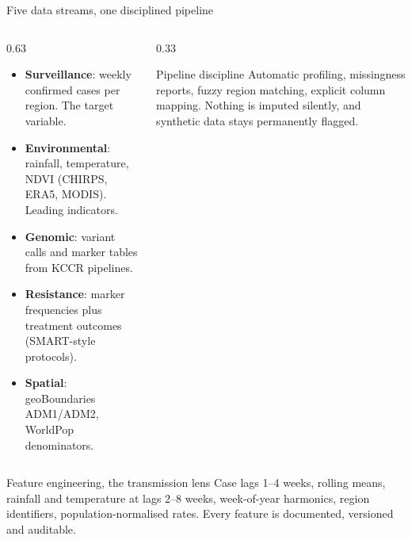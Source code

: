 \documentclass[aspectratio=169,11pt]{beamer}
\begin{document}
\begin{frame}{Five data streams, one disciplined pipeline}
  \begin{columns}[c]
    \begin{column}{0.63\textwidth}
      \small
      \begin{itemize}
        \item \textbf{Surveillance}: weekly confirmed cases per region. The target variable.
        \item \textbf{Environmental}: rainfall, temperature, NDVI (CHIRPS, ERA5, MODIS). Leading indicators.
        \item \textbf{Genomic}: variant calls and marker tables from KCCR pipelines.
        \item \textbf{Resistance}: marker frequencies plus treatment outcomes (SMART-style protocols).
        \item \textbf{Spatial}: geoBoundaries ADM1/ADM2, WorldPop denominators.
      \end{itemize}
    \end{column}
    \begin{column}{0.33\textwidth}
      \begin{alertblock}{Pipeline discipline}
        Automatic profiling, missingness reports, fuzzy region matching, explicit
        column mapping. Nothing is imputed silently, and synthetic data stays
        permanently flagged.
      \end{alertblock}
    \end{column}
  \end{columns}
  \vspace{2mm}
  \begin{block}{Feature engineering, the transmission lens}
    Case lags 1--4 weeks, rolling means, rainfall and temperature at lags 2--8
    weeks, week-of-year harmonics, region identifiers, population-normalised
    rates. Every feature is documented, versioned and auditable.
  \end{block}
\end{frame}
\end{document}
